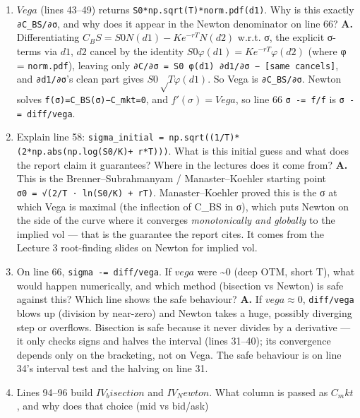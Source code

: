 \documentclass[
  11pt,
]{article}
\begin{document}
\begin{enumerate}
  second says the vol is pinned to tolerance. Both must hold eventually
  since the bracket halves each step; including both protects against
  the flat-vega regime where the price residual stays large per unit of
  σ but the interval has already collapsed.
\item
  \(Vega\) (lines 43--49) returns \texttt{S0*np.sqrt(T)*norm.pdf(d1)}.
  Why is this exactly \texttt{∂C\_BS/∂σ}, and why does it appear in the
  Newton denominator on line 66? \textbf{A.} Differentiating
  \(C_BS = S0 N(d1) − K e^{−rT} N(d2)\) w.r.t. σ, the explicit σ-terms
  via \(d1\), \(d2\) cancel by the identity
  \(S0 φ(d1) = K e^{−rT} φ(d2)\) (where φ = \texttt{norm.pdf}), leaving
  only \texttt{∂C/∂σ\ =\ S0\ φ(d1)\ ∂d1/∂σ\ −\ {[}same\ cancels{]}}, and
  \texttt{∂d1/∂σ}'s clean part gives \(S0 √T φ(d1)\). So Vega is
  \texttt{∂C\_BS/∂σ}. Newton solves \texttt{f(σ)=C\_BS(σ)−C\_mkt=0}, and
  \(f'(σ)=Vega\), so line 66 \texttt{σ\ -=\ f/f\textquotesingle{}} is
  \texttt{σ\ -=\ diff/vega}.
\item
  Explain line 58:
  \texttt{sigma\_initial\ =\ np.sqrt((1/T)*(2*np.abs(np.log(S0/K)+\ r*T)))}.
  What is this initial guess and what does the report claim it
  guarantees? Where in the lectures does it come from? \textbf{A.} This
  is the Brenner--Subrahmanyam / Manaster--Koehler starting point
  \texttt{σ0\ =\ √(2/T\ ·\ \textbar{}ln(S0/K)\ +\ rT\textbar{})}.
  Manaster--Koehler proved this is the σ at which Vega is maximal (the
  inflection of C\_BS in σ), which puts Newton on the side of the curve
  where it converges \emph{monotonically and globally} to the implied
  vol --- that is the guarantee the report cites. It comes from the
  Lecture 3 root-finding slides on Newton for implied vol.
\item
  On line 66, \texttt{sigma\ -=\ diff/vega}. If \(vega\) were
  \textasciitilde0 (deep OTM, short T), what would happen numerically,
  and which method (bisection vs Newton) is safe against this? Which
  line shows the safe behaviour? \textbf{A.} If \(vega ≈ 0\),
  \texttt{diff/vega} blows up (division by near-zero) and Newton takes a
  huge, possibly diverging step or overflows. Bisection is safe because
  it never divides by a derivative --- it only checks signs and halves
  the interval (lines 31--40); its convergence depends only on the
  bracketing, not on Vega. The safe behaviour is on line 34's interval
  test and the halving on line 31.
\item
  Lines 94--96 build \(IV_bisection\) and \(IV_Newton\). What column is
  passed as \(C_mkt\), and why does that choice (mid vs bid/ask)

\end{enumerate}
\end{document}
